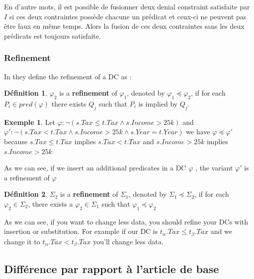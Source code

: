 \documentclass[letterpaper, 12pt]{report}
\theoremstyle{definition}
\newtheorem{mydef}{Définition}
\newtheorem{myexample}{Exemple}
\begin{document}
En d'autre mots, il est possible de fusionner deux denial constraint satisfaite par $I$ si ces deux contraintes possède chacune un prédicat et ceux-ci ne peuvent pas être faux en même temps. Alors la fusion de ces deux contraintes sans les deux prédicats est toujours satisfaite.

\subsubsection{Refinement}
\label{RefinementSection}
In \cite{main} they define the refinement of a DC as :

\begin{mydef}
 $\varphi_2$ is a \textbf{refinement} of $\varphi_1$, denoted by $\varphi_1 \preceq \varphi_2$, if for each $P_i \in pred(\varphi)$ there exists $Q_j$ such that $P_i$ is implied by $Q_j$. 
\end{mydef}

\begin{myexample}
	Let $\varphi : \neg(s.Tax \leq t.Tax \wedge s.Income > 25k)$ and $\varphi ' : \neg(s.Tax < t.Tax \wedge s.Income > 25k \wedge s.Year = t.Year)$ we have $\varphi \preceq \varphi'$ because $s.Tax \leq t.Tax$ implies $s.Tax < t.Tax$ and $s.Income > 25k$ implies $s.Income > 25k$
\end{myexample}

As we can see, if we insert an additional predicates in a DC $\varphi$ , the variant $\varphi '$ is a refinement of $\varphi$
\begin{mydef}
 $\Sigma_2$ is a \textbf{refinement} of $\Sigma_1$, denoted by $\Sigma_1 \preceq \Sigma_2$, if for each $ \varphi_2 \in \Sigma_2$, there exists a $\varphi_2 \in \Sigma_1$ such that $\varphi_1 \preceq \varphi_2$
\end{mydef}

As we can see, if you want to change less data, you should refine your DCs with insertion or substitution. For example if our DC is $t_\alpha.Tax \leq t_\beta.Tax$ and we change it to $t_\alpha.Tax < t_\beta.Tax$ you'll change less data.

\subsection{Différence par rapport à l'article de base}
\end{document}
